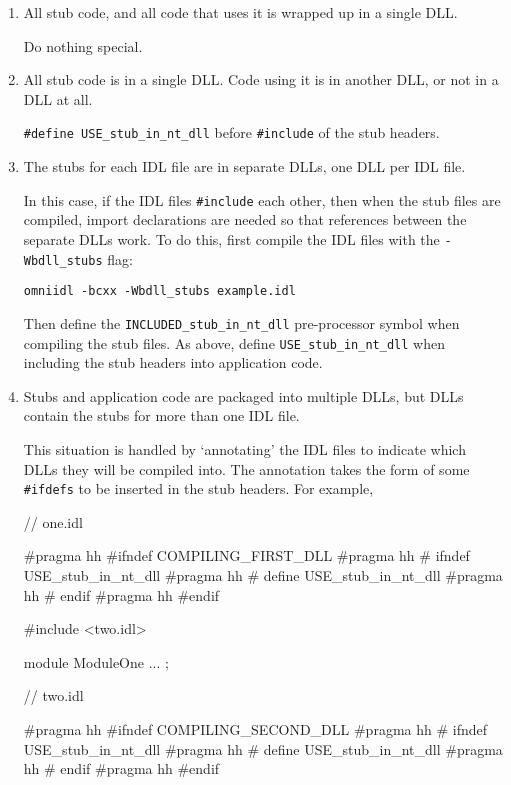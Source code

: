 \documentclass[11pt,twoside,a4paper]{book}
\newcommand{\code}[1]{\texttt{#1}}
\newcommand{\cmdline}[1]{\texttt{#1}}
\begin{document}
\begin{enumerate}

\item All stub code, and all code that uses it is wrapped up in a
      single DLL.

      Do nothing special.

\item All stub code is in a single DLL. Code using it is in another
      DLL, or not in a DLL at all.

      \code{\#define USE\_stub\_in\_nt\_dll} before \code{\#include} of
      the stub headers.

\item The stubs for each IDL file are in separate DLLs, one DLL per
      IDL file.

      In this case, if the IDL files \code{\#include} each other, then
      when the stub files are compiled, import declarations are needed
      so that references between the separate DLLs work. To do this,
      first compile the IDL files with the \cmdline{-Wbdll\_stubs}
      flag:

      \cmdline{omniidl -bcxx -Wbdll\_stubs example.idl}

      Then define the \code{INCLUDED\_stub\_in\_nt\_dll} pre-processor
      symbol when compiling the stub files. As above, define
      \code{USE\_stub\_in\_nt\_dll} when including the stub headers
      into application code.

\item Stubs and application code are packaged into multiple DLLs, but
      DLLs contain the stubs for more than one IDL file.

      This situation is handled by `annotating' the IDL files to
      indicate which DLLs they will be compiled into. The annotation
      takes the form of some \code{\#ifdefs} to be inserted in the
      stub headers. For example,

\begin{idllisting}
// one.idl

#pragma hh #ifndef COMPILING_FIRST_DLL
#pragma hh # ifndef USE_stub_in_nt_dll
#pragma hh #   define USE_stub_in_nt_dll
#pragma hh # endif
#pragma hh #endif

#include <two.idl>

module ModuleOne {
  ...
};


// two.idl

#pragma hh #ifndef COMPILING_SECOND_DLL
#pragma hh # ifndef USE_stub_in_nt_dll
#pragma hh #   define USE_stub_in_nt_dll
#pragma hh # endif
#pragma hh #endif


\end{idllisting}
\end{enumerate}
\end{document}
